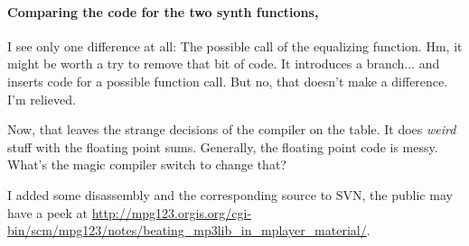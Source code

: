 \documentclass[a4paper,12pt]{scrartcl}
\begin{document}
\paragraph{Comparing the code for the two synth functions,}
I see only one difference at all: The possible call of the equalizing function.
Hm, it might be worth a try to remove that bit of code. It introduces a branch... and inserts code for a possible function call.
But no, that doesn't make a difference. I'm relieved.

Now, that leaves the strange decisions of the compiler on the table. It does {\em weird} stuff with the floating point sums. Generally, the floating point code is messy. What's the magic compiler switch to change that?

I added some disassembly and the corresponding source to SVN, the public may have a peek at \url{http://mpg123.orgis.org/cgi-bin/scm/mpg123/notes/beating_mp3lib_in_mplayer_material/}.
\end{document}
